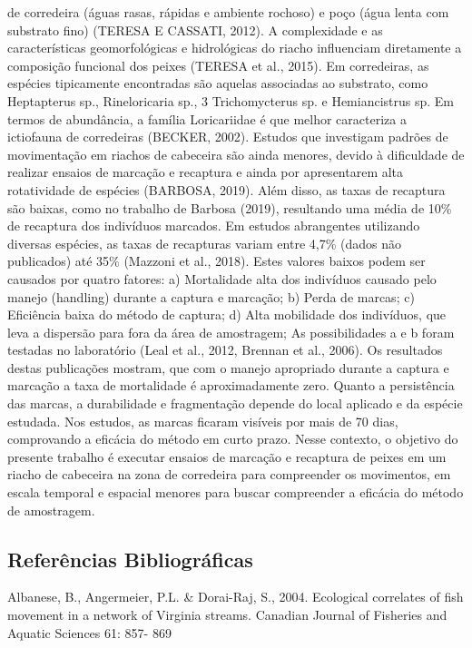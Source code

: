 \documentclass[
]{article}
\begin{document}
de corredeira (águas rasas, rápidas e ambiente rochoso) e poço (água
lenta com substrato fino) (TERESA E CASSATI, 2012). A complexidade e as
características geomorfológicas e hidrológicas do riacho influenciam
diretamente a composição funcional dos peixes (TERESA et al., 2015). Em
corredeiras, as espécies tipicamente encontradas são aquelas associadas
ao substrato, como Heptapterus sp., Rineloricaria sp., 3 Trichomycterus
sp. e Hemiancistrus sp. Em termos de abundância, a família Loricariidae
é que melhor caracteriza a ictiofauna de corredeiras (BECKER, 2002).
Estudos que investigam padrões de movimentação em riachos de cabeceira
são ainda menores, devido à dificuldade de realizar ensaios de marcação
e recaptura e ainda por apresentarem alta rotatividade de espécies
(BARBOSA, 2019). Além disso, as taxas de recaptura são baixas, como no
trabalho de Barbosa (2019), resultando uma média de 10\% de recaptura
dos indivíduos marcados. Em estudos abrangentes utilizando diversas
espécies, as taxas de recapturas variam entre 4,7\% (dados não
publicados) até 35\% (Mazzoni et al., 2018). Estes valores baixos podem
ser causados por quatro fatores: a) Mortalidade alta dos indivíduos
causado pelo manejo (handling) durante a captura e marcação; b) Perda de
marcas; c) Eficiência baixa do método de captura; d) Alta mobilidade dos
indivíduos, que leva a dispersão para fora da área de amostragem; As
possibilidades a e b foram testadas no laboratório (Leal et al., 2012,
Brennan et al., 2006). Os resultados destas publicações mostram, que com
o manejo apropriado durante a captura e marcação a taxa de mortalidade é
aproximadamente zero. Quanto a persistência das marcas, a durabilidade e
fragmentação depende do local aplicado e da espécie estudada. Nos
estudos, as marcas ficaram visíveis por mais de 70 dias, comprovando a
eficácia do método em curto prazo. Nesse contexto, o objetivo do
presente trabalho é executar ensaios de marcação e recaptura de peixes
em um riacho de cabeceira na zona de corredeira para compreender os
movimentos, em escala temporal e espacial menores para buscar
compreender a eficácia do método de amostragem.

\subsection{Referências
Bibliográficas}\label{referuxeancias-bibliogruxe1ficas}

Albanese, B., Angermeier, P.L. \& Dorai-Raj, S., 2004. Ecological
correlates of fish movement in a network of Virginia streams. Canadian
Journal of Fisheries and Aquatic Sciences 61: 857- 869
\end{document}
